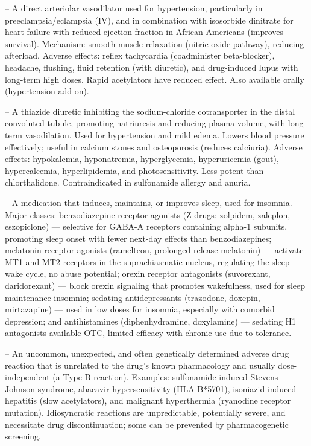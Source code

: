 -- A direct arteriolar vasodilator used for hypertension, particularly in preeclampsia/eclampsia (IV), and in combination with isosorbide dinitrate for heart failure with reduced ejection fraction in African Americans (improves survival). Mechanism: smooth muscle relaxation (nitric oxide pathway), reducing afterload. Adverse effects: reflex tachycardia (coadminister beta-blocker), headache, flushing, fluid retention (with diuretic), and drug-induced lupus with long-term high doses. Rapid acetylators have reduced effect. Also available orally (hypertension add-on).

-- A thiazide diuretic inhibiting the sodium-chloride cotransporter in the distal convoluted tubule, promoting natriuresis and reducing plasma volume, with long-term vasodilation. Used for hypertension and mild edema. Lowers blood pressure effectively; useful in calcium stones and osteoporosis (reduces calciuria). Adverse effects: hypokalemia, hyponatremia, hyperglycemia, hyperuricemia (gout), hypercalcemia, hyperlipidemia, and photosensitivity. Less potent than chlorthalidone. Contraindicated in sulfonamide allergy and anuria.

-- A medication that induces, maintains, or improves sleep, used for insomnia. Major classes: benzodiazepine receptor agonists (Z-drugs: zolpidem, zaleplon, eszopiclone) — selective for GABA-A receptors containing alpha-1 subunits, promoting sleep onset with fewer next-day effects than benzodiazepines; melatonin receptor agonists (ramelteon, prolonged-release melatonin) — activate MT1 and MT2 receptors in the suprachiasmatic nucleus, regulating the sleep-wake cycle, no abuse potential; orexin receptor antagonists (suvorexant, daridorexant) — block orexin signaling that promotes wakefulness, used for sleep maintenance insomnia; sedating antidepressants (trazodone, doxepin, mirtazapine) — used in low doses for insomnia, especially with comorbid depression; and antihistamines (diphenhydramine, doxylamine) — sedating H1 antagonists available OTC, limited efficacy with chronic use due to tolerance.

-- An uncommon, unexpected, and often genetically determined adverse drug reaction that is unrelated to the drug's known pharmacology and usually dose-independent (a Type B reaction). Examples: sulfonamide-induced Stevens-Johnson syndrome, abacavir hypersensitivity (HLA-B*5701), isoniazid-induced hepatitis (slow acetylators), and malignant hyperthermia (ryanodine receptor mutation). Idiosyncratic reactions are unpredictable, potentially severe, and necessitate drug discontinuation; some can be prevented by pharmacogenetic screening.

